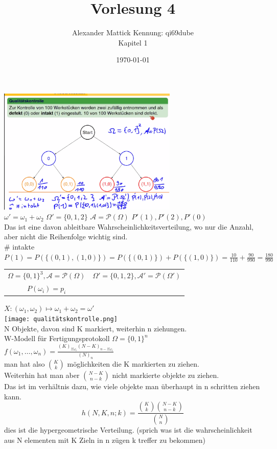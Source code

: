 \documentclass{article}
\author{
Alexander Mattick Kennung: qi69dube\\
Kapitel 1
}
\date{\today}
\title{Vorlesung 4}
\begin{document}
	\maketitle
	\includegraphics[height=6cm]{Urne.png}\\
	$\omega' = \omega_1+\omega_2$ $\Omega' =\{0,1,2\}$ $\mathcal{A} = \mathcal{P}(\Omega)$ $P'(1),P'(2), P'(0)$\\
	Das ist eine davon ableitbare Wahrscheinlichkeitsverteilung, wo nur die Anzahl, aber nicht die Reihenfolge wichtig sind.\\
	$\#$ intakte $P(1) = P(\{(0,1),(1,0)\}) = P(\{(0,1)\})+P(\{(1,0)\}) =\frac{10}{110} +\frac{90}{990}= \frac{180}{990}$\\
	\begin{tabular}{c|c}
	$\Omega=\{0,1\}^3,\mathcal{A} =\mathcal{P}(\Omega)$&$\Omega'=\{0,1,2\},\mathcal{A}'=\mathcal{P}(\Omega')$\\
	$P(\omega_i)=p_i$&
	\end{tabular}
	$X: (\omega_1,\omega_2)\mapsto \omega_1+\omega_2= \omega'$\\
	\texttt{[image: qualitätskontrolle.png]}\\
	N Objekte, davon sind K markiert, weiterhin n ziehungen.\\
	W-Modell für Fertigungsprotokoll $\Omega=\{0,1\}^n$\\
	$f(\omega_1,\dots,\omega_n) = \frac{(K)_{\Sigma\omega_i} (N-K)_{n-\Sigma\omega_i}}{(N)_n}$\\
	man hat also $\binom{K}{k}$ möglichkeiten die K markierten zu ziehen.\\
	Weiterhin hat man aber $\binom{N-K}{n-k}$ nicht markierte objekte zu ziehen.\\
	Das ist im verhältnis dazu, wie viele objekte man überhaupt in n schritten ziehen kann.\\
	$$h(N,K,n;k) = \frac{\binom{K}{k}\binom{N-K}{n-k}}{\binom{N}{n}}$$
	dies ist die hypergeometrische Verteilung. (sprich was ist die wahrscheinlichkeit aus N elementen mit K Zieln in n zügen k treffer zu bekommen)\\
\end{document}
